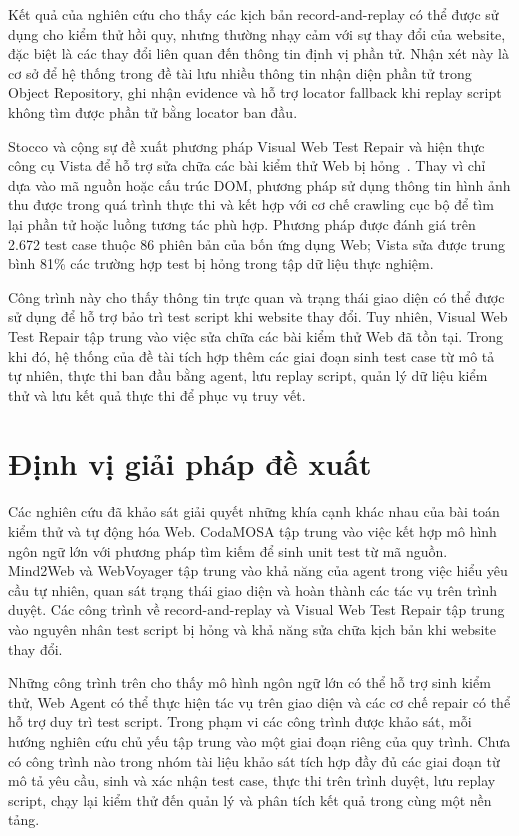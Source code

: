 Kết quả của nghiên cứu cho thấy các kịch bản record-and-replay có thể được sử dụng cho kiểm thử hồi quy, nhưng thường nhạy cảm với sự thay đổi của website, đặc biệt là các thay đổi liên quan đến thông tin định vị phần tử. Nhận xét này là cơ sở để hệ thống trong đề tài lưu nhiều thông tin nhận diện phần tử trong Object Repository, ghi nhận evidence và hỗ trợ locator fallback khi replay script không tìm được phần tử bằng locator ban đầu.

Stocco và cộng sự đề xuất phương pháp Visual Web Test Repair và hiện thực công cụ Vista để hỗ trợ sửa chữa các bài kiểm thử Web bị hỏng~\cite{stocco2018visualrepair}. Thay vì chỉ dựa vào mã nguồn hoặc cấu trúc DOM, phương pháp sử dụng thông tin hình ảnh thu được trong quá trình thực thi và kết hợp với cơ chế crawling cục bộ để tìm lại phần tử hoặc luồng tương tác phù hợp. Phương pháp được đánh giá trên 2.672 test case thuộc 86 phiên bản của bốn ứng dụng Web; Vista sửa được trung bình 81\% các trường hợp test bị hỏng trong tập dữ liệu thực nghiệm.

Công trình này cho thấy thông tin trực quan và trạng thái giao diện có thể được sử dụng để hỗ trợ bảo trì test script khi website thay đổi. Tuy nhiên, Visual Web Test Repair tập trung vào việc sửa chữa các bài kiểm thử Web đã tồn tại. Trong khi đó, hệ thống của đề tài tích hợp thêm các giai đoạn sinh test case từ mô tả tự nhiên, thực thi ban đầu bằng agent, lưu replay script, quản lý dữ liệu kiểm thử và lưu kết quả thực thi để phục vụ truy vết.

\section{Định vị giải pháp đề xuất}

Các nghiên cứu đã khảo sát giải quyết những khía cạnh khác nhau của bài toán kiểm thử và tự động hóa Web. CodaMOSA tập trung vào việc kết hợp mô hình ngôn ngữ lớn với phương pháp tìm kiếm để sinh unit test từ mã nguồn. Mind2Web và WebVoyager tập trung vào khả năng của agent trong việc hiểu yêu cầu tự nhiên, quan sát trạng thái giao diện và hoàn thành các tác vụ trên trình duyệt. Các công trình về record-and-replay và Visual Web Test Repair tập trung vào nguyên nhân test script bị hỏng và khả năng sửa chữa kịch bản khi website thay đổi.

Những công trình trên cho thấy mô hình ngôn ngữ lớn có thể hỗ trợ sinh kiểm thử, Web Agent có thể thực hiện tác vụ trên giao diện và các cơ chế repair có thể hỗ trợ duy trì test script. Trong phạm vi các công trình được khảo sát, mỗi hướng nghiên cứu chủ yếu tập trung vào một giai đoạn riêng của quy trình. Chưa có công trình nào trong nhóm tài liệu khảo sát tích hợp đầy đủ các giai đoạn từ mô tả yêu cầu, sinh và xác nhận test case, thực thi trên trình duyệt, lưu replay script, chạy lại kiểm thử đến quản lý và phân tích kết quả trong cùng một nền tảng.

